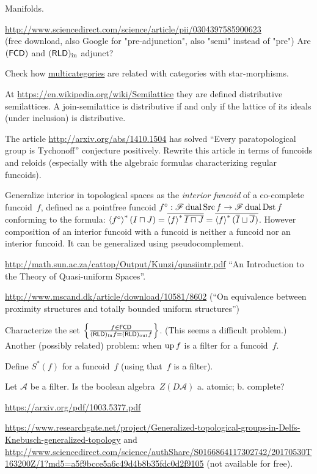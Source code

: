 \documentclass{amsart}
\begin{document}
Manifolds.

\url{http://www.sciencedirect.com/science/article/pii/0304397585900623}\\
(free download, also Google for "pre-adjunction", also "semi" instead of "pre") Are $(\mathsf{FCD})$ and $(\mathsf{RLD})_{\mathrm{in}}$ adjunct?

Check how \href{http://ncatlab.org/nlab/show/multicategory}{multicategories}
are related with categories with star-morphisms.

At \url{https://en.wikipedia.org/wiki/Semilattice} they are defined distributive
semilattices. A join-semilattice is distributive if and only if the lattice of its ideals (under inclusion) is distributive.

The article \url{http://arxiv.org/abs/1410.1504} has solved ``Every paratopological group is Tychonoff'' conjecture positively.
Rewrite this article in terms of funcoids and reloids (especially with the algebraic formulas characterizing regular funcoids).

Generalize interior in topological spaces as the \emph{interior funcoid} of a co-complete funcoid~$f$, defined as a pointfree funcoid
$f^\circ: \mathscr{F}\operatorname{dual}\operatorname{Src} f \rightarrow \mathscr{F}\operatorname{dual}\operatorname{Dst} f$ conforming to the formula:
$\left\langle f^{\circ}\right\rangle ^{\ast} (I \sqcap J) = \overline{\left\langle f\right\rangle ^{\ast} \overline{I \sqcap J}} = \overline{\left\langle f\right\rangle ^{\ast} ( \overline{I} \sqcup \overline{J} )}$.
However composition of an interior funcoid with a funcoid is neither a funcoid nor an interior funcoid.
It can be generalized using pseudocomplement.

\url{http://math.sun.ac.za/cattop/Output/Kunzi/quasiintr.pdf} ``An Introduction to the Theory of Quasi-uniform Spaces''.

\url{http://www.mscand.dk/article/download/10581/8602} (``On equivalence between proximity structures and totally bounded uniform structures'')

Characterize the set $\left\{ \frac{f\in\mathsf{FCD}}{(\mathsf{RLD})_{\mathrm{in}} f=(\mathsf{RLD})_{\mathrm{out}} f}\right\}$. (This seems a difficult problem.)
Another (possibly related) problem: when $\operatorname{up} f$ is a filter for a funcoid~$f$.

Define $S^\ast (f)$ for a funcoid~$f$ (using that~$f$ is a filter).

Let $\mathcal{A}$ be a filter. Is the boolean algebra~$Z(D\mathcal{A})$
a. atomic; b. complete?

\url{https://arxiv.org/pdf/1003.5377.pdf}

\url{https://www.researchgate.net/project/Generalized-topological-groups-in-Delfs-Knebusch-generalized-topology}
and
\url{http://www.sciencedirect.com/science/authShare/S0166864117302742/20170530T163200Z/1?md5=a5f9bcce5a6c49d4b8b35fdc0d2f9105}
(not available for free).
\end{document}
